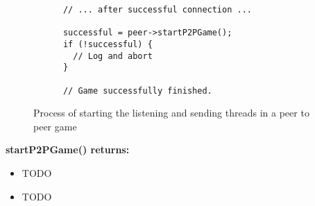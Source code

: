\begin{figure}[!h]
  \centering
  \begin{lstlisting}
      // ... after successful connection ...

      successful = peer->startP2PGame();
      if (!successful) {
        // Log and abort
      }

      // Game successfully finished.
  \end{lstlisting}
  \caption{Process of starting the listening and sending threads in a peer to peer game}
  \label{code:peer_game}
\end{figure}
\textbf{startP2PGame() returns:}
\begin{itemize}
\item TODO

\item TODO
\end{itemize}
